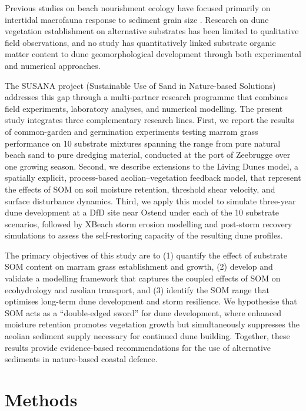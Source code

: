 \documentclass[authoryear,preprint,review,12pt]{elsarticle}
\begin{document}
Previous studies on beach nourishment ecology have focused primarily on intertidal macrofauna response to sediment grain size \citep{speybroeck2006beach, vandeneede2014assessing}. Research on dune vegetation establishment on alternative substrates has been limited to qualitative field observations, and no study has quantitatively linked substrate organic matter content to dune geomorphological development through both experimental and numerical approaches.

The SUSANA project (Sustainable Use of Sand in Nature-based Solutions) addresses this gap through a multi-partner research programme that combines field experiments, laboratory analyses, and numerical modelling. The present study integrates three complementary research lines. First, we report the results of common-garden and germination experiments testing marram grass performance on 10 substrate mixtures spanning the range from pure natural beach sand to pure dredging material, conducted at the port of Zeebrugge over one growing season. Second, we describe extensions to the Living Dunes model, a spatially explicit, process-based aeolian--vegetation feedback model, that represent the effects of SOM on soil moisture retention, threshold shear velocity, and surface disturbance dynamics. Third, we apply this model to simulate three-year dune development at a DfD site near Ostend under each of the 10 substrate scenarios, followed by XBeach storm erosion modelling and post-storm recovery simulations to assess the self-restoring capacity of the resulting dune profiles.

The primary objectives of this study are to (1) quantify the effect of substrate SOM content on marram grass establishment and growth, (2) develop and validate a modelling framework that captures the coupled effects of SOM on ecohydrology and aeolian transport, and (3) identify the SOM range that optimises long-term dune development and storm resilience. We hypothesise that SOM acts as a ``double-edged sword'' for dune development, where enhanced moisture retention promotes vegetation growth but simultaneously suppresses the aeolian sediment supply necessary for continued dune building. Together, these results provide evidence-based recommendations for the use of alternative sediments in nature-based coastal defence.


\section{Methods}
\end{document}
